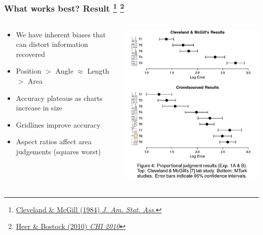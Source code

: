 \begin{frame}
  \frametitle{What works best? Result
  \footnote{\tiny{\href{https://www.jstor.org/stable/2288400}{Cleveland \& McGill (1984) \textit{J. Am. Stat. Ass.}}}}  
  \footnote{\tiny{\href{http://vis.stanford.edu/files/2010-MTurk-CHI.pdf}{Heer \& Bostock (2010) \textit{CHI 2010}}}}
  }
  \begin{columns}[T]
    \begin{column}{5cm}
      \begin{itemize}
        \item \textcolor{hutton_green}{We have inherent biases that can distort information recovered}
        \item \textcolor{hutton_blue}{Position $>$ Angle $\approx$ Length $>$ Area}
        \item Accuracy plateaus as charts increase in size
        \item Gridlines improve accuracy
        \item \textcolor{hutton_purple}{Aspect ratios affect area judgements (squares worst)}
      \end{itemize}
    \end{column}
    \begin{column}{6cm}  
      \includegraphics[width=1\textwidth]{images/proportional_results}    
    \end{column}
  \end{columns}      
\end{frame}